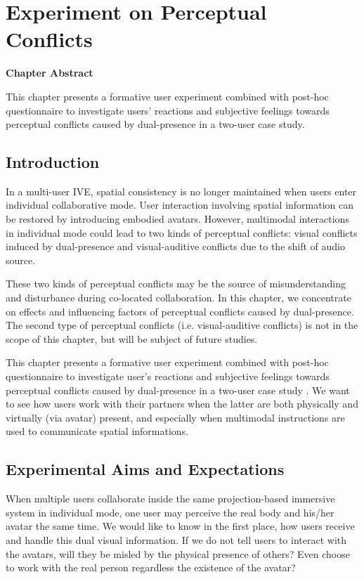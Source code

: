 \chapter{Experiment on Perceptual Conflicts}
\label{chapter:expe_perception}
\pagebreak

\textbf{Chapter Abstract}

This chapter presents a formative user experiment combined with post-hoc questionnaire to investigate users' reactions and subjective feelings towards perceptual conflicts caused by dual-presence in a two-user case study.

\vspace*{2\baselineskip}

\minitoc

\newpage
\section{Introduction}
In a multi-user IVE, spatial consistency is no longer maintained when users enter individual collaborative mode. User interaction involving spatial information can be restored by introducing embodied avatars. However, multimodal interactions in individual mode could lead to two kinds of perceptual conflicts: visual conflicts induced by dual-presence and visual-auditive conflicts due to the shift of audio source.

These two kinds of perceptual conflicts may be the source of misunderstanding and disturbance during co-located collaboration. In this chapter, we concentrate on effects and influencing factors of perceptual conflicts caused by dual-presence. The second type of perceptual conflicts (i.e. visual-auditive conflicts) is not in the scope of this chapter, but will be subject of future studies.

This chapter presents a formative user experiment combined with post-hoc questionnaire to investigate user's reactions and subjective feelings towards perceptual conflicts caused by dual-presence in a two-user case study \citep{Chen2014PCM}. We want to see how users work with their partners when the latter are both physically and virtually (via avatar) present, and especially when multimodal instructions are used to communicate spatial informations.


\section{Experimental Aims and Expectations}
When multiple users collaborate inside the same projection-based immersive system in individual mode, one user may perceive the real body and his/her avatar the same time. We would like to know in the first place, how users receive and handle this dual visual information. If we do not tell users to interact with the avatars, will they be misled by the physical presence of others? Even choose to work with the real person regardless the existence of the avatar?

